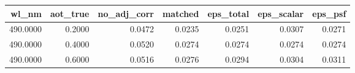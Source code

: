 \begin{tabular}{rrrrrrr}
\toprule
wl_nm & aot_true & no_adj_corr & matched & eps_total & eps_scalar & eps_psf \\
\midrule
490.0000 & 0.2000 & 0.0472 & 0.0235 & 0.0251 & 0.0307 & 0.0271 \\
490.0000 & 0.4000 & 0.0520 & 0.0274 & 0.0274 & 0.0274 & 0.0274 \\
490.0000 & 0.6000 & 0.0516 & 0.0276 & 0.0294 & 0.0304 & 0.0311 \\
\bottomrule
\end{tabular}
